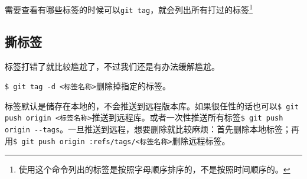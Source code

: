 \documentclass[UTF8]{ctexart}
\begin{document}
需要查看有哪些标签的时候可以\verb!git tag!，就会列出所有打过的标签\footnote{使用这个命令列出的标签是按照字母顺序排序的，不是按照时间顺序的。} 

\subsection{撕标签}
标签打错了就比较尴尬了，不过我们还是有办法缓解尴尬。

\verb!$ git tag -d <标签名称>!删除掉指定的标签。

标签默认是储存在本地的，不会推送到远程版本库。如果很任性的话也可以\verb!$ git push origin <标签名称>!推送到远程库。或者一次性推送所有标签\verb!$ git push origin --tags!。一旦推送到远程，想要删除就比较麻烦：首先删除本地标签；再用\verb!$ git push origin :refs/tags/<标签名称>!删除远程标签。
\end{document}
